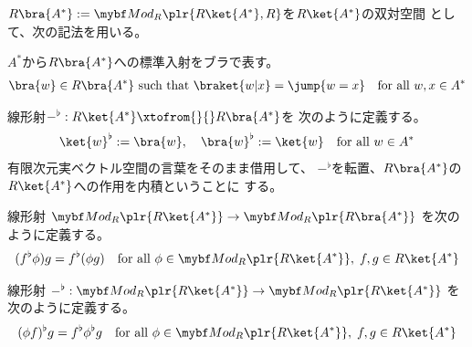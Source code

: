 {	$R\bra{A^*}:=\cat{Mod}_R\plr{R\ket{A^*},R}$を$R\ket{A^*}$の双対空間
	として、次の記法を用いる。
	\begin{description}\setlength{\itemsep}{-1mm} %
		\item[標準基底] $A^*$から$R\bra{A^*}$への標準入射をブラで表す。
		\begin{equation*}\begin{split}
			\bra{w}\in R\bra{A^*} \text{ such that }
			\braket{w|x} = \jump{w=x} \quad\text{for all } w,x\in A^*
		\end{split}\end{equation*}
		\item[転置と内積] 線形射$-^\flat:R\ket{A^*}\xtofrom{}{}R\bra{A^*}$を
		次のように定義する。
		\begin{equation*}\begin{split}
			\ket{w}^\flat := \bra{w},\quad \bra{w}^\flat := \ket{w}
			\quad\text{for all } w\in A^*
		\end{split}\end{equation*}
		有限次元実ベクトル空間の言葉をそのまま借用して、
		$-^\flat$を転置、$R\bra{A^*}$の$R\ket{A^*}$への作用を内積ということに
		する。
		\item[作用素] 線形射
		$\cat{Mod}_R\plr{R\ket{A^*}}\to\cat{Mod}_R\plr{R\bra{A^*}}$
		を次のように定義する。
		\begin{equation*}\begin{split}
			(f^\flat\phi)g = f^\flat(\phi g)
			\quad\text{for all } \phi\in\cat{Mod}_R\plr{R\ket{A^*}}
			,\; f,g\in R\ket{A^*}
		\end{split}\end{equation*}
		\item[作用素の転置] 線形射
		$-^\flat:\cat{Mod}_R\plr{R\ket{A^*}}\to\cat{Mod}_R\plr{R\ket{A^*}}$
		を次のように定義する。
		\begin{equation*}\begin{split}
			(\phi f)^\flat g = f^\flat\phi^\flat g
			\quad\text{for all } \phi\in\cat{Mod}_R\plr{R\ket{A^*}}
			,\; f,g\in R\ket{A^*}
		\end{split}\end{equation*}
	\end{description} %

}
